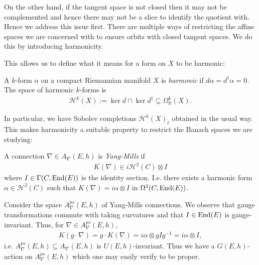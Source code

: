 \documentclass[12pt]{ociamthesis}  %
\begin{document}
On the other hand, if the tangent space is not closed then it may not be complemented and
hence there may not be a slice to identify the quotient with. Hence we address this issue first.
There are multiple ways of restricting the affine spaces we are concerned with to
ensure orbits with closed tangent spaces. We do this by introducing harmonicity.

This allows us to
define what it means for a form on $X$ to be harmonic:

\begin{definition}
  A $k$-form $\alpha$ on a compact Riemannian manifold $X$ is \emph{harmonic} if
  $d \alpha = d^\dagger \alpha = 0$. The space of harmonic $k$-forms is
  \begin{align*}
    \mathcal H^k(X) := \ker d \cap \ker d^\dagger \subseteq \Omega^k_{\mathbb{R}}(X).
  \end{align*}
\end{definition}

In particular, we have Sobolev completions $\mathcal H^k(X)_\ell$
obtained in the usual way. This makes harmonicity a suitable property to
restrict the Banach spaces we are studying:

\begin{definition}
  A connection $\nabla\in A_\nabla(E,h)$ is \emph{Yang-Mills} if
  \begin{align}\label{eq:yang_mills_condition}
    K(\nabla) \in i\mathcal H^2(C)\otimes I
  \end{align}
  where $I\in\Gamma(C,\operatorname{End}(E))$ is the identity section.
  I.e. there exists a harmonic form $\alpha\in\mathcal H^2(C)$ such
  that $K(\nabla) = i\alpha\otimes I$ in $\Omega^2(C,\operatorname{End}(E))$.
\end{definition}

Consider the space $A_\nabla^{ps}(E,h)$ of Yang-Mills connections.
We observe that gauge transformations commute with taking curvatures and
that $I\in\operatorname{End}(E)$ is gauge-invariant. Thus, for $\nabla\in A_\nabla^{ps}(E,h)$,
\begin{align*}
  K(g\cdot\nabla)
  = g\cdot K(\nabla)
  = i\alpha\otimes gIg^{-1}
  = i\alpha\otimes I,
\end{align*}
i.e. $A_\nabla^{ps}(E,h)\subseteq A_\nabla(E,h)$ is $U(E,h)$-invariant.
Thus we have a $G(E,h)$-action on $A^{ps}_\nabla(E,h)$ which
one may easily verify to be proper.
\end{document}

